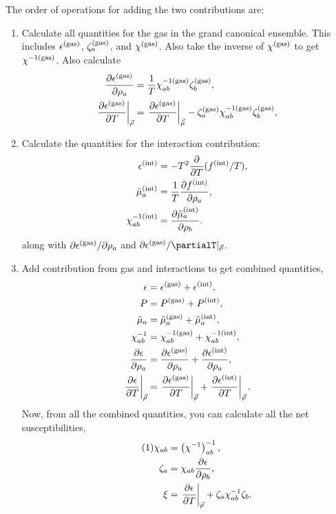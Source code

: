 \documentclass[12pt]{article}
\numberwithin{equation}{section}
\numberwithin{figure}{section}
\newcommand\eqnumber{\addtocounter{equation}{1}\tag{\theequation}}
\begin{document}
The order of operations for adding the two contributions are:
\begin{enumerate}\itemsep=0pt
        \item Calculate all quantities for the gas in the grand canonical ensemble. This includes $\epsilon^{\rm(gas)}$, $\zeta_a^{\rm(gas)}$, and $\chi^{\rm(gas)}$. Also take the inverse of $\chi^{\rm(gas)}$ to get $\chi^{-1{\rm(gas)}}$. Also calculate
        \begin{align*}
        \frac{\partial\epsilon^{\rm(gas)}}{\partial\rho_a}&=\frac{1}{T}\chi^{-1{\rm(gas)}}_{ab}\zeta^{\rm(gas)}_b,\\
        \left.\frac{\partial\epsilon^{\rm(gas)}}{\partial T}\right|_{\vec{\rho}}&=\left.\frac{\partial\epsilon^{\rm(gas)}}{\partial T}\right|_{\vec{\tilde{\mu}}}-\zeta^{\rm(gas)}_a\chi^{-1{\rm(gas)}}_{ab}\zeta^{\rm(gas)}_b,\\
        \end{align*}
        \item Calculate the quantities for the interaction contribution: 
        \begin{align*}
        \epsilon^{\rm(int)}&=-T^2\frac{\partial}{\partial T}(f^{\rm(int)}/T),\\
        \tilde{\mu}_a^{\rm(int)}&=\frac{1}{T}\frac{\partial f^{\rm(int)}}{\partial\rho_a},\\
        \chi^{-1{\rm(int)}}_{ab}&=\frac{\partial\tilde{\mu}^{\rm(int)}_a}{\partial\rho_b}.
        \end{align*}
        along with $\partial\epsilon^{\rm(gas)}/\partial\rho_a$ and $\partial\epsilon^{\rm(gas)}/\partialT|_{\vec{\rho}}$.
        \item Add contribution from gas and interactions to  get combined quantities,
        \begin{align*}
        \epsilon&=\epsilon^{\rm(gas)}+\epsilon^{\rm(int)},\\
        P&=P^{\rm(gas)}+P^{\rm(int)},\\
        \tilde{\mu}_a&=\tilde{\mu}_a^{\rm(gas)}+\tilde{\mu}_a^{\rm(int)},\\
        \chi^{-1}_{ab}&=\chi^{-1{\rm(gas)}}_{ab}+\chi^{-1{\rm(int)}}_{ab},\\
        \frac{\partial\epsilon}{\partial\rho_a}&=\frac{\partial\epsilon^{\rm(gas)}}{\partial\rho_a}+\frac{\partial\epsilon^{\rm(int)}}{\partial\rho_a},\\
        \left.\frac{\partial\epsilon}{\partial T}\right|_{\vec{\rho}}&=\left.\frac{\partial\epsilon^{\rm(gas)}}{\partial T}\right|_{\vec{\rho}}
        +\left.\frac{\partial\epsilon^{\rm(int)}}{\partial T}\right|_{\vec{\rho}}.
        \end{align*}
        Now, from all the combined quantities, you can calculate all the net susceptibilities,
        \begin{align*}\eqnumber
        \chi_{ab}&=\left(\chi^{-1}\right)^{-1}_{ab},\\
        \zeta_a&=\chi_{ab}\frac{\partial\epsilon}{\partial\rho_b},\\
        \xi&=\left.\frac{\partial\epsilon}{\partial T}\right|_{\vec{\rho}}+\zeta_a\chi^{-1}_{ab}\zeta_b.
        \end{align*}
\end{enumerate}
\end{document}
